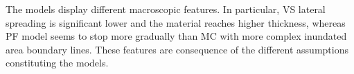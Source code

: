 \documentclass{article}
\begin{document}
\newpage
{}

The models display different macroscopic features. In particular, VS lateral spreading is significant lower and the material reaches higher thickness, whereas PF model seems to stop more gradually than MC with more complex inundated area boundary lines. These features are consequence of the different assumptions constituting the models. 
\end{document}
